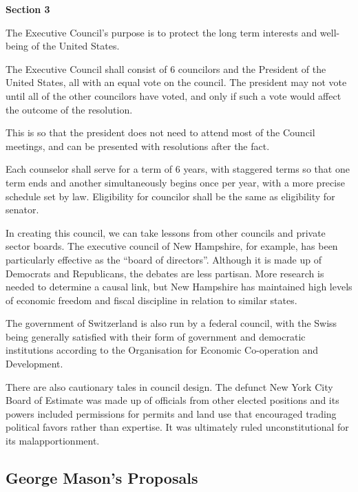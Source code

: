 \documentclass{article}
\begin{document}
\begin{quoting}
\textbf{Section 3}

The Executive Council’s purpose is to protect the long term interests and well-being of the United States.

The Executive Council shall consist of 6 councilors and the President of the United States, all with an equal vote on the council. The president may not vote until all of the other councilors have voted, and only if such a vote would affect the outcome of the resolution.
\end{quoting}

This is so that the president does not need to attend most of the Council meetings, and can be presented with resolutions after the fact.

\begin{quoting}
Each counselor shall serve for a term of 6 years, with staggered terms so that one term ends and another simultaneously begins once per year, with a more precise schedule set by law. Eligibility for councilor shall be the same as eligibility for senator.
\end{quoting}

In creating this council, we can take lessons from other councils and private sector boards\cite{Khanna}. The executive council of New Hampshire, for example, has been particularly effective as the “board of directors”\cite{Hahn-Burkett}. Although it is made up of Democrats and Republicans, the debates are less partisan\cite{Timmins}. More research is needed to determine a causal link, but New Hampshire has maintained high levels of economic freedom and fiscal discipline in relation to similar states\cite{Ruger}.

The government of Switzerland is also run by a federal council, with the Swiss being generally satisfied with their form of government and democratic institutions according to the Organisation for Economic Co-operation and Development\cite{Kaufman}.

There are also cautionary tales in council design. The defunct New York City Board of Estimate was made up of officials from other elected positions and its powers included permissions for permits and land use that encouraged trading political favors rather than expertise\cite{Purnick}. It was ultimately ruled unconstitutional for its malapportionment\cite{Board_of_Estimate}.

\subsection{George Mason's Proposals}
\end{document}
